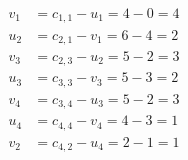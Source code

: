 \[
\begin{aligned}
v_{1} &= c_{1,1} - u_{1} = 4 - 0 = 4 \\
u_{2} &= c_{2,1} - v_{1} = 6 - 4 = 2 \\
v_{3} &= c_{2,3} - u_{2} = 5 - 2 = 3 \\
u_{3} &= c_{3,3} - v_{3} = 5 - 3 = 2 \\
v_{4} &= c_{3,4} - u_{3} = 5 - 2 = 3 \\
u_{4} &= c_{4,4} - v_{4} = 4 - 3 = 1 \\
v_{2} &= c_{4,2} - u_{4} = 2 - 1 = 1 \\
\end{aligned}
\]

